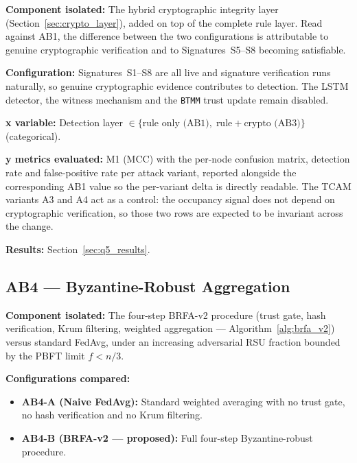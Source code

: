 \documentclass[12pt, a4paper]{report}
\begin{document}
{{\textbf{Component isolated:}
The hybrid cryptographic integrity layer
(Section~\ref{sec:crypto_layer}), added on top of the
complete rule layer. Read against AB1, the
difference between the two configurations is
attributable to genuine cryptographic verification
and to Signatures~S5--S8 becoming satisfiable.

\textbf{Configuration:}
Signatures~S1--S8 are all live and signature
verification runs naturally, so genuine
cryptographic evidence contributes to detection.
The \ac{LSTM} detector, the witness mechanism and
the \texttt{BTMM} trust update remain disabled.

\textbf{x variable:} Detection layer
$\in \{\text{rule only (AB1)},\;
\text{rule}+\text{crypto (AB3)}\}$ (categorical).

\textbf{y metrics evaluated:} M1 (\ac{MCC}) with the
per-node confusion matrix, detection rate and
false-positive rate per attack variant, reported
alongside the corresponding AB1 value so the
per-variant delta is directly readable. The
\ac{TCAM} variants A3 and A4 act as a control: the
occupancy signal does not depend on cryptographic
verification, so those two rows are expected to be
invariant across the change.

\textbf{Results:} Section~\ref{sec:q5_results}.

\subsection{AB4 --- Byzantine-Robust Aggregation}
\label{sec:ab4}

\textbf{Component isolated:}
The four-step BRFA-v2 procedure (trust gate, hash
verification, Krum filtering, weighted aggregation
--- Algorithm~\ref{alg:brfa_v2}) versus standard
FedAvg, under an increasing adversarial \ac{RSU}
fraction bounded by the \ac{PBFT} limit $f < n/3$.

\textbf{Configurations compared:}
\begin{itemize}
    \item \textbf{AB4-A (Naive FedAvg):} Standard
    weighted averaging with no trust gate, no hash
    verification and no Krum filtering.
    \item \textbf{AB4-B (BRFA-v2 --- proposed):}
    Full four-step Byzantine-robust procedure.
\end{itemize}

}}
\end{document}
